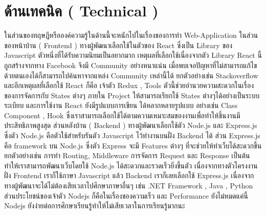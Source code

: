 \section{ด้านเทคนิค ( Technical )}
ในส่วนของทฤษฏีหรือองค์ความรู้ในด้านนี้จะหนักไปในเรื่องของการทำ
Web-Application ในส่วนของหน้าบ้าน ( Frontend ) ทางผู้พัฒนาเลือกใช้ในตัวของ
React \cite{React} ซึ่งเป็น Library ของ Javascript ตัวหนึ่งที่ได้รับความนิยมเป็นอยากมาก เหตุผลที่เลือกใช้เนื่องจากตัว Library React นี้ถูกสร้างจากทาง Facebook 
จึงมี Community อย่างหนาแน่น  เมื่อพบเจอปัญหาที่ไม่สามารถแก้ไขด้วยตนเองได้ก็สามารถไปค้นหาจากแหล่ง Community เหล่านี้ได้ ยกตัวอย่างเช่น Stackoverflow 
และอีกเหตุผลที่เลือกใช้ React ก็คือ เจ้าตัว Redux \cite{Redux} ,  Tools ตัวนี้ช่วยอำนวยความสะดวกในเรื่องของการจัดการกับ States ต่างๆ  ภายใน Project ให้สามารถเรียกใช้ States ต่างๆได้อย่างเป็นระบบระเบียบ และการใช้งาน React ยังมีรูปแบบการเขียน
ได้หลากหลายรูปแบบ อย่างเช่น Class Component , Hook ซึ่งเราสามารถเลือกใช้ได้ตามความเหมาะสมของงานเพื่อทำให้ชิ้นงานมีประสิทธิภาพสูงสุด
ส่วนหลังบ้าน ( Backend ) ทางผู้พัฒนาเลือกใช้ตัว Node.js \cite{NodeJs} และ Express.js \cite{Express} ซึ่งตัว Node.js คือตัวใช้สำหรับรันตัว Javascript ไว้ทำงานบนฝั่ง Backend ได้  ส่วน Express.js คือ  framework บน Node.js 
ซึ่งตัว Express จะมี Features ต่างๆ  ที่จะช่วยให้ทำเว็บได้สะดวกขึ้น ยกตัวอย่างเช่น การทำ Routing, Middleware การจัดการ Request และ Response เป็นต้น  ทำให้เราสามารถพัฒนาเว็บโดยใช้ Node.js ได้สะดวกและรวดเร็วยิ่งขึ้นตัว
เนื่องจากทางตัวโครงงานฝั่ง Frontend เราก็ใช้ภาษา Javascript แล้ว Backend เราก็เลยเลือกใช้ Express.js  เนื่องจากทางผู้พัฒนาจะได้ไม่ต้องเสียเวลาไปศึกษาภาษาอื่นๆ เช่น  .NET Framework , Java , Python 
ส่วนประโยชน์ของเจ้าตัว Nodejs ก็คือในเรื่องของความเร็ว และ Performance ยังไม่หมดแค่นี้ Nodejs ยังง่ายต่อการศึกษาเรียนรู้ทำให้ไม่เสียเวลาในการเรียนรู้มากนะ 









